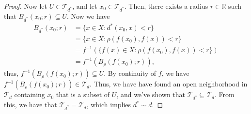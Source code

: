 \documentclass[10pt,a4paper]{article}
\theoremstyle{theorem}
\theoremstyle{definition}
\newcommand{\Tau}{\mathcal{T}}
\begin{document}
\begin{proof}
Now let $U \in \Tau_{d^*}$, and let $x_0 \in \Tau_{d^*}$. Then, there exists a radius $r \in \mathbb{R}$ such that $B_{d^*}(x_0; r) \subseteq U$. Now we have
\begin{align*}
B_{d^*}(x_0; r) &= \{x \in X: d^*(x_0, x) < r\}\\
&= \{x \in X: \rho(f(x_0), f(x)) < r\}\\
&= f^{-1}(\{f(x) \in X: \rho(f(x_0), f(x)) < r\})\\
&= f^{-1}(B_\rho(f(x_0); r)),
\end{align*}
thus, $f^{-1}(B_\rho(f(x_0); r)) \subseteq U$. By continuity of $f$, we have $f^{-1}(B_\rho(f(x_0); r)) \in \Tau_d$. Thus, we have have found an open neighborhood in $\Tau_d$ containing $x_0$ that is a subset of $U$, and we've shown that $\Tau_{d^*} \subseteq \Tau_d$. From this, we have that $\Tau_{d^*} =  \Tau_d$, which implies $d^* \sim d$.
\end{proof}
\end{document}
